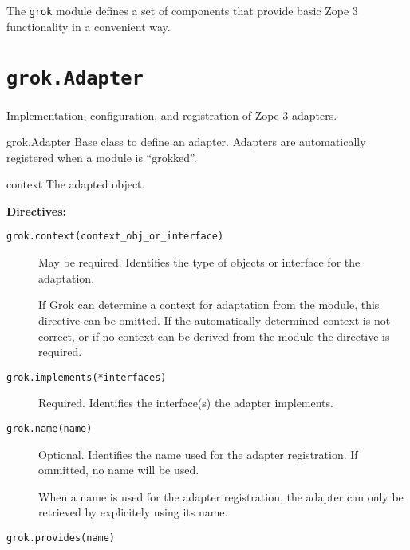 \documentclass[10pt,a4paper,english]{manual}
\begin{document}
The \texttt{grok} module defines a set of components that provide basic Zope 3
functionality in a convenient way.



\section{\texttt{grok.Adapter}}

Implementation, configuration, and registration of Zope 3 adapters.
\begin{classdesc*}{grok.Adapter}
Base class to define an adapter. Adapters are automatically registered when a
module is ``grokked''.
\begin{memberdesc}{context}
The adapted object.
\end{memberdesc}

\textbf{Directives:}
\begin{description}
\item[{\texttt{grok.context(context{\_}obj{\_}or{\_}interface)}}] %

May be required. Identifies the type of objects or interface for the adaptation.

If Grok can determine a context for adaptation from the module, this directive
can be omitted. If the automatically determined context is not correct, or if no
context can be derived from the module the directive is required.

\item[{\texttt{grok.implements(*interfaces)}}] %

Required. Identifies the interface(s) the adapter implements.

\item[{\texttt{grok.name(name)}}] %

Optional. Identifies the name used for the adapter registration. If ommitted, no
name will be used.

When a name is used for the adapter registration, the adapter can only be
retrieved by explicitely using its name.

\item[{\texttt{grok.provides(name)}}] %


\end{description}
\end{classdesc*}
\end{document}
